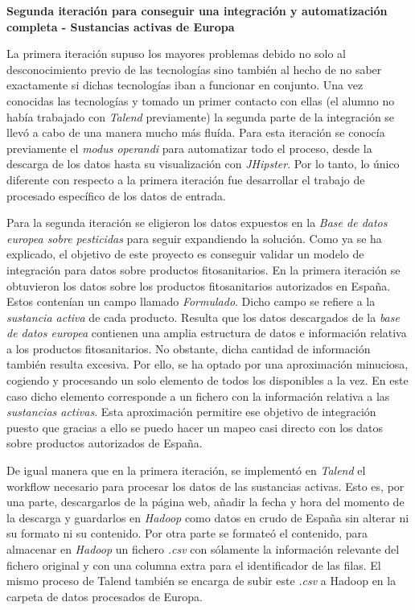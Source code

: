 \bigskip
\par 
\textbf{Segunda iteración para conseguir una integración y automatización completa - Sustancias activas de Europa}
\bigskip
\par 
La primera iteración supuso los mayores problemas debido no solo al desconocimiento previo de las tecnologías sino también al hecho de no saber exactamente si dichas tecnologías iban a funcionar en conjunto. Una vez conocidas las tecnologías y tomado un primer contacto con ellas (el alumno no había trabajado con \textit{Talend} previamente) la segunda parte de la integración se llevó a cabo de una manera mucho más fluída. Para esta iteración se conocía previamente el \textit{modus operandi} para automatizar todo el proceso, desde la descarga de los datos hasta su visualización con \textit{JHipster}. Por lo tanto, lo único diferente con respecto a la primera iteración fue desarrollar el trabajo de procesado específico de los datos de entrada. 
\par  
Para la segunda iteración se eligieron los datos expuestos en la \textit{Base de datos europea sobre pesticidas} \cite{pesticides_eu} para seguir expandiendo la solución. Como ya se ha explicado, el objetivo de este proyecto es conseguir validar un modelo de integración para datos sobre productos fitosanitarios. En la primera iteración se obtuvieron los datos sobre los productos fitosanitarios autorizados en España. Estos contenían un campo llamado \textit{Formulado}. Dicho campo se refiere a la \textit{sustancia activa} de cada producto. Resulta que los datos descargados de la \textit{base de datos europea} contienen una amplia estructura de datos e información relativa a los productos fitosanitarios. No obstante, dicha cantidad de información también resulta excesiva. Por ello, se ha optado por una aproximación minuciosa, cogiendo y procesando un solo elemento de todos los disponibles a la vez. En este caso dicho elemento corresponde a un fichero con la información relativa a las \textit{sustancias activas}. Esta aproximación permitire ese objetivo de integración puesto que gracias a ello se puedo hacer un mapeo casi directo con los datos sobre productos autorizados de España. 
\par 
De igual manera que en la primera iteración, se implementó en \textit{Talend} el workflow necesario para procesar los datos de las sustancias activas. Esto es, por una parte, descargarlos de la página web, añadir la fecha y hora del momento de la descarga y guardarlos en \textit{Hadoop} como datos en crudo de España sin alterar ni su formato ni su contenido. Por otra parte se formateó el contenido, para almacenar en \textit{Hadoop} un fichero \textit{.csv} con sólamente la información relevante del fichero original y con una columna extra para el identificador de las filas. El mismo proceso de Talend también se encarga de subir este \textit{.csv} a Hadoop en la carpeta de datos procesados de Europa. 
